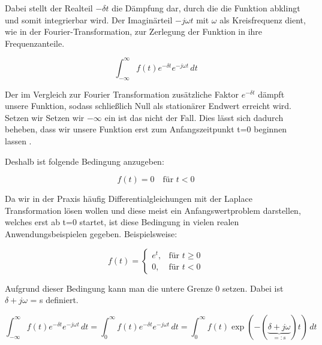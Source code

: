 Dabei stellt der Realteil \(-\delta t\) die Dämpfung dar, durch die die Funktion abklingt und somit integrierbar wird. Der Imaginärteil \(-j\omega t\) mit \(\omega\) als Kreisfrequenz dient, wie in der Fourier-Transformation, zur Zerlegung der Funktion in ihre Frequenzanteile.
 

\begin{equation}
    \int_{-\infty}^{\infty} f(t) e^{-\delta t} e^{-j \omega t} \, dt
    \label{eq:fourier_modifiziert}
    \end{equation}

Der im Vergleich zur Fourier Transformation zusätzliche Faktor $e^{-\delta t}$ dämpft unsere Funktion, sodass schließlich Null als stationärer Endwert erreicht wird. Setzen wir Setzen wir $-\infty$ ein ist das nicht der Fall. Dies lässt sich dadurch beheben, dass wir unsere Funktion erst zum Anfangszeitpunkt t=0 beginnen lassen \cite[S.~14]{buch3}.

Deshalb ist folgende Bedingung anzugeben:

\begin{equation}
    f(t) = 0 \quad \text{für } t < 0
    \label{eq:ft_bedingung}
    \end{equation}

Da wir in der Praxis häufig Differentialgleichungen mit der Laplace Transformation lösen wollen und diese meist ein Anfangswertproblem darstellen, welches erst ab t=0 startet, ist diese Bedingung in vielen realen Anwendungsbeispielen gegeben. Beispielsweise:

\begin{equation}
    f(t) = 
    \begin{cases}
    e^t, & \text{für } t \geq 0 \\
    0,   & \text{für } t < 0
    \end{cases}
    \label{eq:ft_definition}
    \end{equation}

Aufgrund dieser Bedingung kann man die untere Grenze 0 setzen. Dabei ist $\delta + j\omega$ = s definiert.

\begin{equation}
    \int_{-\infty}^{\infty} f(t) e^{-\delta t} e^{-j \omega t} \, dt
    = \int_{0}^{\infty} f(t) e^{-\delta t} e^{-j \omega t} \, dt
    = \int_{0}^{\infty} f(t) \exp\left(-(\underbrace{\delta + j\omega}_{=:s})t\right) \, dt
    \label{eq:mod_fourier}
    \end{equation}
    \cite[S.~879]{buch1}


